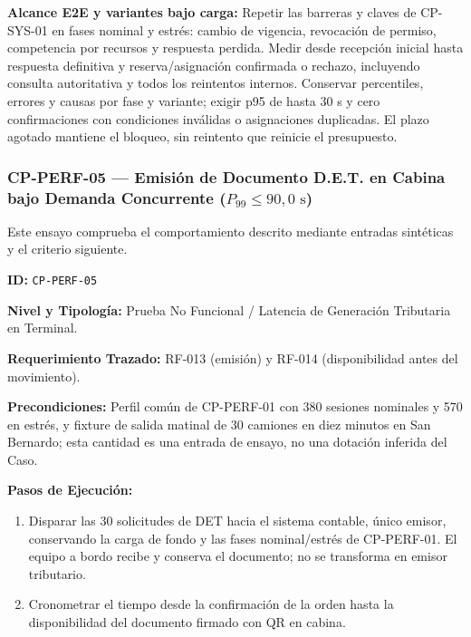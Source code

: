 \par\noindent\textbf{Alcance E2E y variantes bajo carga:} Repetir las barreras y claves de CP-SYS-01 en fases nominal y estrés: cambio de vigencia, revocación de permiso, competencia por recursos y respuesta perdida. Medir desde recepción inicial hasta respuesta definitiva y reserva/asignación confirmada o rechazo, incluyendo consulta autoritativa y todos los reintentos internos. Conservar percentiles, errores y causas por fase y variante; exigir p95 de hasta 30 s y cero confirmaciones con condiciones inválidas o asignaciones duplicadas. El plazo agotado mantiene el bloqueo, sin reintento que reinicie el presupuesto.\par

\subsubsection*{CP-PERF-05 — Emisión de Documento D.E.T. en Cabina bajo Demanda Concurrente ($P_{99} \le 90{,}0\text{ s}$)}\label{sec:9-cp-perf-05}
Este ensayo comprueba el comportamiento descrito mediante entradas sintéticas y el criterio siguiente.

\par\noindent \textbf{ID:} \texttt{CP-\allowbreak{}PERF-\allowbreak{}05}\par
\par\noindent \textbf{Nivel y Tipología:} Prueba No Funcional / Latencia de Generación Tributaria en Terminal.\par
\par\noindent \textbf{Requerimiento Trazado:} RF-013 (emisión) y RF-014 (disponibilidad antes del movimiento).\par
\par\noindent \textbf{Precondiciones:} Perfil común de CP-PERF-01 con 380 sesiones nominales y 570 en estrés, y fixture de salida matinal de 30 camiones en diez minutos en San Bernardo; esta cantidad es una entrada de ensayo, no una dotación inferida del Caso.\par
\par\noindent \textbf{Pasos de Ejecución:}\par
\begin{enumerate}
\item Disparar las 30 solicitudes de DET hacia el sistema contable, único emisor, conservando la carga de fondo y las fases nominal/estrés de CP-PERF-01. El equipo a bordo recibe y conserva el documento; no se transforma en emisor tributario.
\item Cronometrar el tiempo desde la confirmación de la orden hasta la disponibilidad del documento firmado con QR en cabina.
\end{enumerate}

